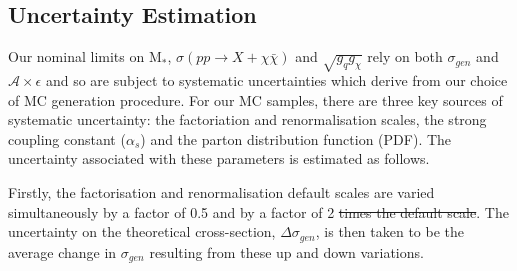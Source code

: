 \subsection{Uncertainty Estimation}
\begin{flushleft}
Our nominal limits on M$_{*}$, $\sigma(pp \rightarrow X + \chi\bar{\chi})$ and $\sqrt{g_{q}g_{\chi}}$ rely on both $\sigma_{gen}$ and $\mathcal{A}\times\epsilon$ and so are subject to systematic uncertainties which derive from our choice of MC generation procedure. For our MC samples, there are three key sources of systematic uncertainty: the factoriation and renormalisation scales, the strong coupling constant ($\alpha_{s}$) and the parton distribution function (PDF). The uncertainty associated with these parameters is estimated as follows.
\bigskip

%
%
Firstly, the factorisation and renormalisation default scales are varied simultaneously by a factor of 0.5  and by a factor of 2  \st{times the default scale}. The uncertainty on the theoretical cross-section, $\Delta \sigma_{gen}$, is then taken to be the average change in $\sigma_{gen}$ resulting from these up and down variations.
\bigskip


\end{flushleft}
